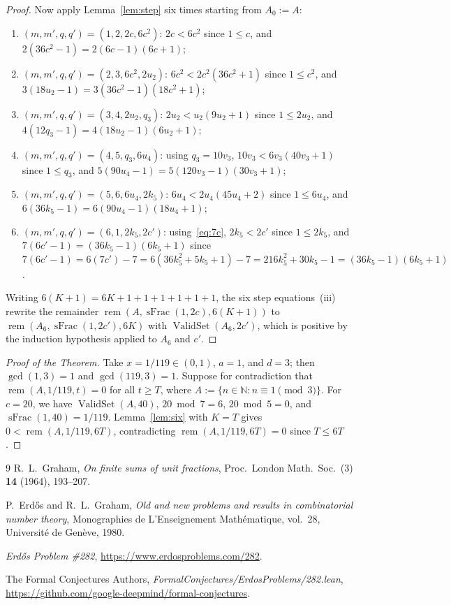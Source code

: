 \documentclass[11pt,a4paper]{amsart}
\newcommand{\rem}{\operatorname{rem}}
\newcommand{\ValidSet}{\operatorname{ValidSet}}
\newcommand{\sFrac}{\operatorname{sFrac}}
\begin{document}
\begin{proof}
Now apply Lemma~\ref{lem:step} six times starting from $A_0 := A$:
\begin{enumerate}
\item $(m, m', q, q') = (1, 2, 2 c, 6 c^2)$: $2 c < 6 c^2$ since $1 \le c$, and $2(36 c^2 - 1) = 2(6 c - 1)(6 c + 1)$;
\item $(m, m', q, q') = (2, 3, 6 c^2, 2 u_2)$: $6 c^2 < 2 c^2 (36 c^2 + 1)$ since $1 \le c^2$, and $3(18 u_2 - 1) = 3(36 c^2 - 1)(18 c^2 + 1)$;
\item $(m, m', q, q') = (3, 4, 2 u_2, q_3)$: $2 u_2 < u_2 (9 u_2 + 1)$ since $1 \le 2 u_2$, and $4(12 q_3 - 1) = 4(18 u_2 - 1)(6 u_2 + 1)$;
\item $(m, m', q, q') = (4, 5, q_3, 6 u_4)$: using $q_3 = 10 v_3$, $10 v_3 < 6 v_3 (40 v_3 + 1)$ since $1 \le q_3$, and $5(90 u_4 - 1) = 5(120 v_3 - 1)(30 v_3 + 1)$;
\item $(m, m', q, q') = (5, 6, 6 u_4, 2 k_5)$: $6 u_4 < 2 u_4 (45 u_4 + 2)$ since $1 \le 6 u_4$, and $6(36 k_5 - 1) = 6(90 u_4 - 1)(18 u_4 + 1)$;
\item $(m, m', q, q') = (6, 1, 2 k_5, 2 c')$: using~\eqref{eq:7c}, $2 k_5 < 2 c'$ since $1 \le 2 k_5$, and $7(6 c' - 1) = (36 k_5 - 1)(6 k_5 + 1)$ since $7(6 c' - 1) = 6(7 c') - 7 = 6(36 k_5^2 + 5 k_5 + 1) - 7 = 216 k_5^2 + 30 k_5 - 1 = (36 k_5 - 1)(6 k_5 + 1)$.
\end{enumerate}
Writing $6(K + 1) = 6 K + 1 + 1 + 1 + 1 + 1 + 1$, the six step equations~(iii) rewrite the remainder $\rem(A, \sFrac(1, 2 c), 6(K + 1))$ to $\rem(A_6, \sFrac(1, 2 c'), 6 K)$ with $\ValidSet(A_6, 2 c')$, which is positive by the induction hypothesis applied to $A_6$ and $c'$.
\end{proof}

\begin{proof}[Proof of the Theorem]
Take $x = 1 / 119 \in (0, 1)$, $a = 1$, and $d = 3$; then $\gcd(1, 3) = 1$ and $\gcd(119, 3) = 1$. Suppose for contradiction that $\rem(A, 1 / 119, t) = 0$ for all $t \ge T$, where $A := \{n \in \mathbb{N} : n \equiv 1 \pmod{3}\}$. For $c = 20$, we have $\ValidSet(A, 40)$, $20 \bmod 7 = 6$, $20 \bmod 5 = 0$, and $\sFrac(1, 40) = 1 / 119$. Lemma~\ref{lem:six} with $K = T$ gives $0 < \rem(A, 1 / 119, 6 T)$, contradicting $\rem(A, 1 / 119, 6 T) = 0$ since $T \le 6 T$.
\end{proof}

\begin{thebibliography}{9}
R.~L.~Graham, \emph{On finite sums of unit fractions}, Proc.\ London Math.\ Soc.\ (3) \textbf{14} (1964), 193--207.

P.~Erd\H{o}s and R.~L.~Graham, \emph{Old and new problems and results in combinatorial number theory}, Monographies de L'Enseignement Math\'ematique, vol.~28, Universit\'e de Gen\`eve, 1980.

\emph{Erd\H{o}s Problem \#282}, \url{https://www.erdosproblems.com/282}.

The Formal Conjectures Authors, \emph{FormalConjectures/ErdosProblems/282.lean},\\ \url{https://github.com/google-deepmind/formal-conjectures}.
\end{thebibliography}
\end{document}
